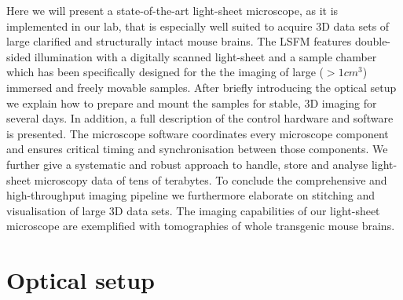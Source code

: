 \documentclass[12pt]{spieman}  %
\begin{document}
Here we will present a state-of-the-art light-sheet microscope, as it is implemented in our lab, that is especially well suited to acquire 3D data sets of large clarified and structurally intact mouse brains. The LSFM features double-sided illumination with a digitally scanned light-sheet and a sample chamber which has been specifically designed for the the imaging of large ($> 1cm^3$) immersed and freely movable samples. After briefly introducing the optical setup we explain how to prepare and mount the samples for stable, 3D imaging for several days. In addition, a full description of the control hardware and software is presented. The microscope software coordinates every microscope component and ensures critical timing and synchronisation between those components. %
We further give a systematic and robust approach to handle, store and analyse light-sheet microscopy data of tens of terabytes. To conclude the comprehensive and high-throughput imaging pipeline we furthermore elaborate on stitching and visualisation of large 3D data sets. The imaging capabilities of our light-sheet microscope are exemplified with tomographies of whole transgenic mouse brains.


\section{Optical setup}
\end{document}
